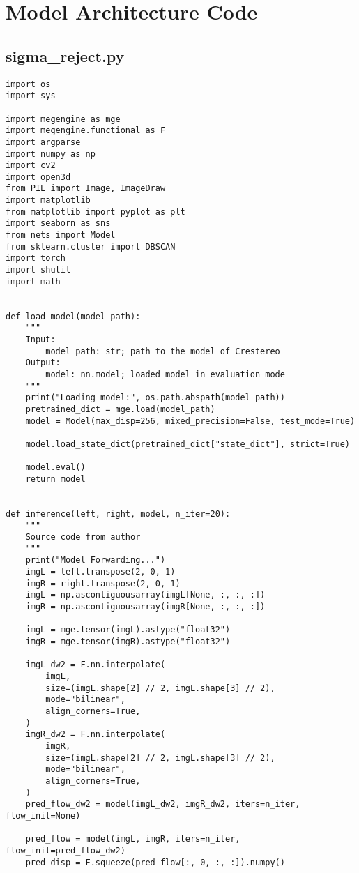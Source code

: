
\section*{Model Architecture Code}

\subsection*{sigma\_reject.py}
\begin{verbatim}
import os
import sys

import megengine as mge
import megengine.functional as F
import argparse
import numpy as np
import cv2
import open3d
from PIL import Image, ImageDraw
import matplotlib
from matplotlib import pyplot as plt
import seaborn as sns
from nets import Model
from sklearn.cluster import DBSCAN
import torch
import shutil
import math


def load_model(model_path):
    """
    Input:
        model_path: str; path to the model of Crestereo
    Output:
        model: nn.model; loaded model in evaluation mode
    """
    print("Loading model:", os.path.abspath(model_path))
    pretrained_dict = mge.load(model_path)
    model = Model(max_disp=256, mixed_precision=False, test_mode=True)

    model.load_state_dict(pretrained_dict["state_dict"], strict=True)

    model.eval()
    return model


def inference(left, right, model, n_iter=20):
    """
    Source code from author
    """
    print("Model Forwarding...")
    imgL = left.transpose(2, 0, 1)
    imgR = right.transpose(2, 0, 1)
    imgL = np.ascontiguousarray(imgL[None, :, :, :])
    imgR = np.ascontiguousarray(imgR[None, :, :, :])

    imgL = mge.tensor(imgL).astype("float32")
    imgR = mge.tensor(imgR).astype("float32")

    imgL_dw2 = F.nn.interpolate(
        imgL,
        size=(imgL.shape[2] // 2, imgL.shape[3] // 2),
        mode="bilinear",
        align_corners=True,
    )
    imgR_dw2 = F.nn.interpolate(
        imgR,
        size=(imgL.shape[2] // 2, imgL.shape[3] // 2),
        mode="bilinear",
        align_corners=True,
    )
    pred_flow_dw2 = model(imgL_dw2, imgR_dw2, iters=n_iter, flow_init=None)

    pred_flow = model(imgL, imgR, iters=n_iter, flow_init=pred_flow_dw2)
    pred_disp = F.squeeze(pred_flow[:, 0, :, :]).numpy()


\end{verbatim}

